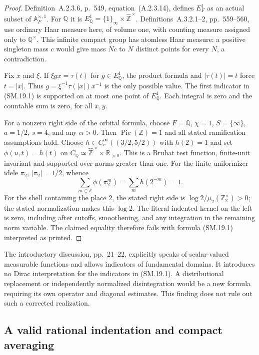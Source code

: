 \documentclass[11pt,a4paper]{article}
\theoremstyle{definition}\newtheorem{definition}[theorem]{Definition}
\theoremstyle{remark}\newtheorem{remark}[theorem]{Remark}
\begin{document}
\begin{proof}
Definition~A.2.3.6, p.~549, equation~(A.2.3.14), defines
$E_F^1$ as an actual subset of $\mathbb A_F^{\times,1}$.
For $\mathbb Q$ it is
$E_{\mathbb Q}^1=\{1\}_\infty\times\widehat{\mathbb Z}^{\,\times}$.
Definitions~A.3.2.1--2, pp.~559--560, use ordinary Haar measure
here, of volume one, with counting measure assigned only to
$\mathbb Q^\times$.  This infinite compact group has atomless
Haar measure: a positive singleton mass $c$ would give mass
$Nc$ to $N$ distinct points for every $N$, a contradiction.

Fix $x$ and $\xi$.  If $\xi gx=\tau(t)$ for $g\in E_{\mathbb Q}^1$,
the product formula and $|\tau(t)|=t$ force $t=|x|$.
Thus $g=\xi^{-1}\tau(|x|)x^{-1}$ is the only possible value.
The first indicator in (SM.19.1) is supported on at most one
point of $E_{\mathbb Q}^1$.  Each integral is zero and the
countable sum is zero, for all $x,y$.

For a nonzero right side of the orbital formula, choose
$F=\mathbb Q$, $\chi=1$, $S=\{\infty\}$, $a=1/2$, $s=4$,
and any $\alpha>0$.  Then $\operatorname{Pic}(\mathbb Z)=1$
and all stated ramification assumptions hold.
Choose $h\in C_c^\infty((3/2,5/2))$ with $h(2)=1$ and set
$\phi(u,t)=h(t)$ on
$C_{\mathbb Q}\simeq\widehat{\mathbb Z}^{\,\times}\times\mathbb R_{>0}$.
This is a Bruhat test function, finite-unit invariant and
supported over norms greater than one.  For the finite uniformizer
idele $\pi_2$, $|\pi_2|=1/2$, whence
\[
 \sum_{m\in\mathbb Z}\phi(\pi_2^m)
       =\sum_mh(2^{-m})=1.
\]
For the shell containing the place $2$, the stated right side is
$\log2/\mu_2(\mathbb Z_2^\times)>0$; the stated normalization
makes this $\log2$.  The literal indented kernel on the left
is zero, including after cutoffs, smoothening, and any integration
in the remaining norm variable.  The claimed equality therefore
fails with formula (SM.19.1) interpreted as printed.
\end{proof}

The introductory discussion, pp.~21--22, explicitly speaks of
scalar-valued measurable functions and allows indicators of
fundamental domains.  It introduces no Dirac interpretation
for the indicators in (SM.19.1).  A distributional replacement
or independently normalized disintegration would be a new
formula requiring its own operator and diagonal estimates.
This finding does not rule out such a corrected realization.

\subsection{A valid rational indentation and compact averaging}
\end{document}
